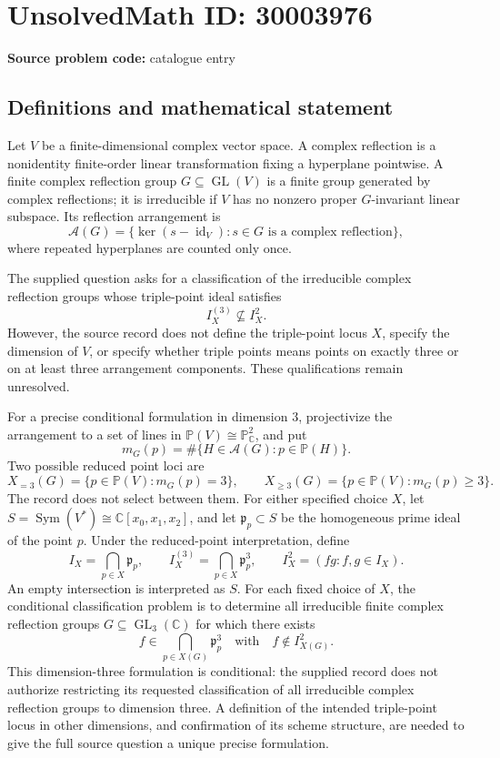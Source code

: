 \documentclass[11pt]{article}
\newcommand{\C}{\mathbb{C}}
\newcommand{\PP}{\mathbb{P}}
\begin{document}
\section*{UnsolvedMath ID: 30003976}
\textbf{Source problem code:} catalogue entry
\subsection{Definitions and mathematical statement}
Let \(V\) be a finite-dimensional complex vector space. A complex reflection is a nonidentity finite-order linear transformation fixing a hyperplane pointwise. A finite complex reflection group \(G\subseteq\operatorname{GL}(V)\) is a finite group generated by complex reflections; it is irreducible if \(V\) has no nonzero proper \(G\)-invariant linear subspace. Its reflection arrangement is
\[
\mathcal A(G)=\{\ker(s-\operatorname{id}_V):s\in G\text{ is a complex reflection}\},
\]
where repeated hyperplanes are counted only once.

The supplied question asks for a classification of the irreducible complex reflection groups whose triple-point ideal satisfies
\[
I_X^{(3)}\not\subseteq I_X^2.
\]
However, the source record does not define the triple-point locus \(X\), specify the dimension of \(V\), or specify whether triple points means points on exactly three or on at least three arrangement components. These qualifications remain unresolved.

For a precise conditional formulation in dimension \(3\), projectivize the arrangement to a set of lines in \(\PP(V)\cong\PP^2_{\C}\), and put
\[
m_G(p)=\#\{H\in\mathcal A(G):p\in\PP(H)\}.
\]
Two possible reduced point loci are
\[
X_{=3}(G)=\{p\in\PP(V):m_G(p)=3\},\qquad
X_{\geq3}(G)=\{p\in\PP(V):m_G(p)\geq3\}.
\]
The record does not select between them. For either specified choice \(X\), let \(S=\operatorname{Sym}(V^*)\cong\C[x_0,x_1,x_2]\), and let \(\mathfrak p_p\subset S\) be the homogeneous prime ideal of the point \(p\). Under the reduced-point interpretation, define
\[
I_X=\bigcap_{p\in X}\mathfrak p_p,\qquad
I_X^{(3)}=\bigcap_{p\in X}\mathfrak p_p^3,\qquad
I_X^2=(fg:f,g\in I_X).
\]
An empty intersection is interpreted as \(S\). For each fixed choice of \(X\), the conditional classification problem is to determine all irreducible finite complex reflection groups \(G\subseteq\operatorname{GL}_3(\C)\) for which there exists
\[
f\in\bigcap_{p\in X(G)}\mathfrak p_p^3\quad\text{with}\quad f\notin I_{X(G)}^2.
\]
This dimension-three formulation is conditional: the supplied record does not authorize restricting its requested classification of all irreducible complex reflection groups to dimension three. A definition of the intended triple-point locus in other dimensions, and confirmation of its scheme structure, are needed to give the full source question a unique precise formulation.
\end{document}
